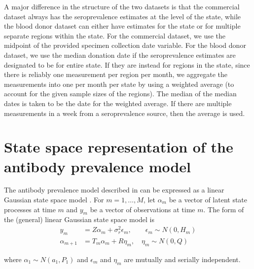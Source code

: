 A major difference in the structure of the two datasets is that the commercial
dataset always has the seroprevalence estimates at the level of the state, while
the blood donor dataset can either have estimates for the state or for multiple
separate regions within the state. For the commercial dataset, we use the
midpoint of the provided specimen collection date variable.  For the blood donor
dataset, we use the median donation date if the seroprevalence estimates are
designated to be for entire state. If they are instead for regions in the state,
since there is reliably one measurement per region per month, we aggregate the
measurements into one per month per state by using a weighted average (to
account for the given sample sizes of the regions). The median of the median
dates is taken to be the date for the weighted average. If there are multiple
measurements in a week from a seroprevalence source, then the average is used.


\section{State space representation of the antibody prevalence
model}\label{sec:ssapm} 
\begin{linenomath*}
The antibody prevalence model described in  can be expressed
as a linear Gaussian state space model \citep{durbin2012time}.
For $m = 1, \dots, M$, let $\alpha_m$ be a vector of
latent state processes at time $m$ and $y_m$ be a vector of
observations at time $m$. The form of the (general) linear Gaussian state space model is 
\begin{align}
y_m &= Z\alpha_m + \sigma^2_r\epsilon_m, \qquad \epsilon_m \sim N(0, H_m) \label{eq:ss1}\\
\alpha_{m+1} &= T_m\alpha_m + R\eta_m, \quad \eta_m \sim N(0, Q) \label{eq:ss2}
\end{align}
\end{linenomath*}
where $\alpha_1 \sim N(a_1, P_1)$ and 
$\epsilon_m$ and $\eta_m$ are mutually and serially independent.



